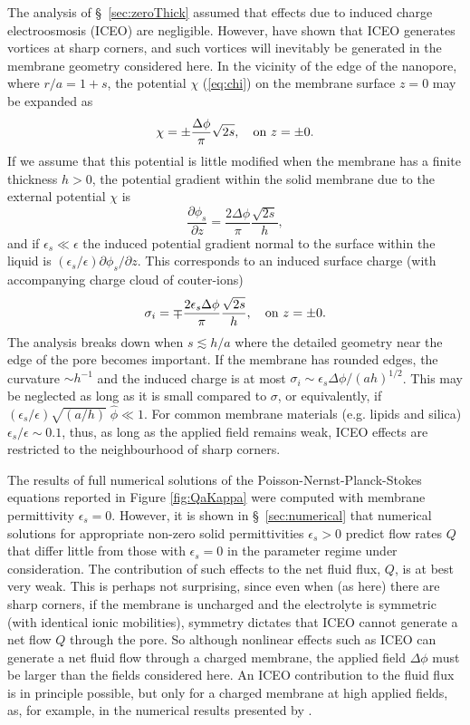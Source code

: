 The analysis of \S~\ref{sec:zeroThick} assumed that effects due to induced charge electroosmosis (ICEO) are negligible. However, \cite{Thamida2002} have shown that ICEO generates vortices at sharp corners, and such
vortices will inevitably be generated in the membrane geometry considered here. In the vicinity of the edge of the nanopore, where $r/a=1+s$, the potential $\chi$ (\ref{eq:chi}) on the membrane surface
$z=0$ may be expanded as
\begin{equation}
\chi=\pm\frac{\Delta\phi}{\pi}\sqrt{2s},\quad \hbox{on $z=\pm0$.}
\end{equation}
If we assume that this potential is little modified when the membrane has a finite thickness $h>0$, the potential gradient within the solid membrane due to the external potential $\chi$ is
\begin{equation}
\frac{\partial\phi_s}{\partial z}=\frac{2\Delta\phi}{\pi}\frac{\sqrt{2s}}{h},
\end{equation}
and if $\epsilon_s\ll\epsilon$ the induced potential gradient normal to the surface within the liquid is 
$(\epsilon_s/\epsilon)\partial\phi_s/\partial z$. This corresponds to an induced surface charge (with accompanying charge cloud of couter-ions)
\begin{equation}
\sigma_i=\mp\frac{2\epsilon_s\Delta\phi}{\pi}\frac{\sqrt{2s}}{h}
,\quad \hbox{on $z=\pm0$.}
\label{induced_charge}
\end{equation}
The analysis breaks down when $s \lesssim h/a$ where the detailed geometry near the edge of the pore becomes important. If the membrane has rounded edges, the curvature $\sim h^{-1}$ and the induced charge is at most $\sigma_{i} \sim \epsilon_s\Delta\phi/(ah)^{1/2}$. This may be neglected as long as it is small compared to $\sigma$, or equivalently, if $(\epsilon_s/\epsilon) \sqrt{(a/h)} \; \hat{\phi} \ll 1$.
For common membrane materials (e.g. lipids and silica) $\epsilon_s / \epsilon \sim 0.1$, thus, 
as long as the applied field remains weak, ICEO effects are restricted to the neighbourhood of
sharp corners.

The results of full numerical solutions of the Poisson-Nernst-Planck-Stokes equations reported in Figure \ref{fig:QaKappa} were computed with membrane permittivity $\epsilon_s=0$.
However, it is shown in \S~\ref{sec:numerical} that numerical solutions for appropriate non-zero solid permittivities $\epsilon_s >0$ predict flow rates $Q$ that differ little from those with $\epsilon_s=0$
in the parameter regime under consideration. The contribution of such effects to the net fluid flux, $Q$,
is at best very weak. This is perhaps not surprising, since even when (as here) there are sharp corners, if the membrane is uncharged and the electrolyte is symmetric (with identical ionic mobilities),
symmetry dictates that ICEO cannot generate a net flow $Q$ through the pore. So although nonlinear
effects such as ICEO can generate a net fluid flow through a charged membrane, the applied field $\Delta\phi$ must be larger than the fields considered here. An ICEO contribution to the fluid flux is in principle possible, but only for a charged membrane at high applied fields, as, for example, in the numerical results presented by \cite{Mao2013}.

